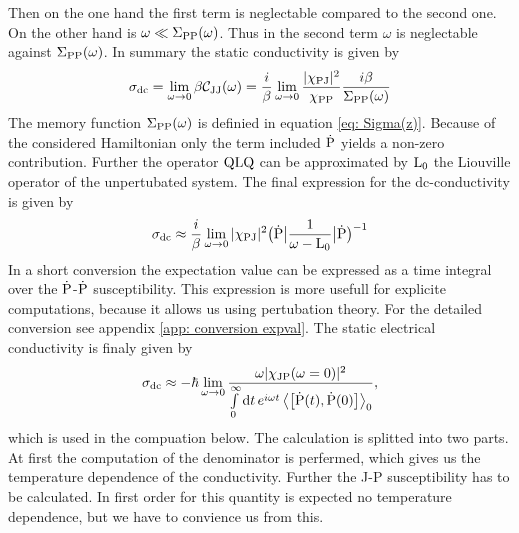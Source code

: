 Then on the one hand the first term is neglectable compared to the second one. 
On the other hand is $\omega \ll \Sigma_{\mathrm{PP}}(\omega)$.
Thus in the second term $\omega$ is neglectable against $\Sigma_{\mathrm{PP}}(\omega)$.
In summary the static conductivity is given by
%
\begin{align}
	\sigma_{\mathrm{dc}} = \lim\limits_{\omega \to 0} \beta \mathcal{C}_{\mathrm{JJ}}(\omega) = \frac{i}{\beta} \lim\limits_{\omega \to 0} \frac{\vert\chi_{\mathrm{PJ}}\vert^{2}}{\chi_{\mathrm{PP}}} \frac{i \beta}{\Sigma_{\mathrm{PP}}(\omega)}
\end{align}
%
The memory function $\Sigma_{\mathrm{PP}}(\omega)$ is definied in equation \eqref{eq: Sigma(z)}.
Because of the considered Hamiltonian only the term included $\dot{\mathrm{P}}$ yields a non-zero contribution.
Further the operator $\mathrm{QLQ}$ can be approximated by $\mathrm{L}_{0}$ the Liouville operator of the unpertubated system. 
The final expression for the dc-conductivity is given by
%
\begin{align}
	\sigma_{\mathrm{dc}} \approx \frac{i}{\beta} \lim\limits_{\omega \to 0} \vert\chi_{\mathrm{PJ}}\vert^{2} \big({\dot{\mathrm{P}}}\big| \frac{1}{\omega - \mathrm{L_{0}}} \big|{\dot{\mathrm{P}}}\big)^{-1}
\end{align}
%
In a short conversion the expectation value can be expressed as a time integral over the $\dot{\mathrm{P}}$-$\dot{\mathrm{P}}$ susceptibility.
This expression is more usefull for explicite computations, because it allows us using pertubation theory.
For the detailed conversion see appendix \ref{app: conversion expval}.
The static electrical conductivity is finaly given by
%
\begin{align}
	\sigma_{\mt{dc}} \approx -\hbar \lim\limits_{\omega \to 0} \frac{\omega \vert \chi_{\mt{JP}}(\omega = 0) \vert^{2}}{\int\limits_{0}^{\infty} \dd{t} e^{i\omega t} \expval{\comm{\dot{\mt{P}}(t)}{\dot{\mt{P}}(0)}}_{0}},
	\label{eq: formula static conductivity}
\end{align}
%
which is used in the compuation below.
The calculation is splitted into two parts.
At first the computation of the denominator is perfermed, which gives us the temperature dependence of the conductivity.
Further the J-P susceptibility has to be calculated.
In first order for this quantity is expected no temperature dependence, but we have to convience us from this.
